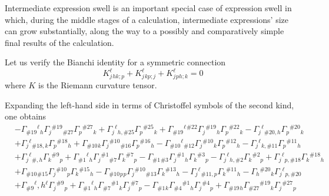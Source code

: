 Intermediate expression swell is an important special case of expression swell in which, during the middle stages of a calculation, intermediate expressions' size can grow substantially, along the way to a possibly and comparatively simple final results of the calculation.
%
\begin{example}
  Let us verify the Bianchi identity for a symmetric connection
  \begin{equation*}
    K^{\ell}_{j}{}_{hk;p} + K^{\ell}_{j}{}_{kp;j} + K^{\ell}_{j}{}_{ph;k} = 0
  \end{equation*}
  where $K$ is the Riemann curvature tensor.

  Expanding the left-hand side in terms of Christoffel symbols of the second kind, one obtains
  \begin{equation*}
    \begin{aligned}
      & -\Gamma_{\# 19}{ }^{\ell}{ }_h \Gamma_j{ }^{\# 19}{ }_{\# 27} \Gamma_p{ }^{\# 27}{ }_k+\Gamma_j{ }^{\ell}{ }_{h, \# 25} \Gamma_p{ }^{\# 25}{ }_k+\Gamma_{\# 19}{ }^{\ell}{ }^{\# 22} \Gamma_j{ }^{\# 19}{ }_h \Gamma_p{ }^{\# 22}{ }_k-\Gamma_j{ }^{\ell}{ }_{\# 20, h} \Gamma_p{ }^{\# 20}{ }_k \\
      & +\Gamma_j{ }^{\ell}{ }_{\# 18, k} \Gamma_p{ }^{\# 18}{ }_h+\Gamma_{\# 10}{ }_k \Gamma_j{ }^{\# 10}{ }_{\# 16} \Gamma_p{ }^{\# 16}{ }_h-\Gamma_{\# 10}{ }^{\ell}{ }_{\# 12} \Gamma_j{ }^{\# 10}{ }_k \Gamma_p{ }^{\# 12}{ }_h-\Gamma_j{ }^{\ell}{ }_{k, \# 11} \Gamma_p{ }^{\# 11}{ }_h \\
      & +\Gamma_j{ }^{\ell}{ }_{\#, h} \Gamma_k{ }^{\# 9}{ }_p+\Gamma_{\# 1}{ }^{\ell}{ }_h \Gamma_j{ }^{\# 1}{ }_{\# 7} \Gamma_k{ }^{\# 7}{ }_p-\Gamma_{\# 1}{ }_{\# 3} \Gamma_j{ }^{\# 1}{ }_h \Gamma_k{ }^{\# 3}{ }_p-\Gamma_j{ }^{\ell}{ }_{h, \# 2} \Gamma_k{ }^{\# 2}{ }_p+\Gamma_j{ }^{\ell}{ }_{p, \# 18} \Gamma_k{ }^{\# 18}{ }_h \\
      & +\Gamma_{\# 10}{ }_{\# 15} \Gamma_j{ }^{\# 10}{ }_p \Gamma_k{ }^{\# 15}{ }_h-\Gamma_{\# 10}{ }_p{ }_p \Gamma_j{ }^{\# 10}{ }_{\# 13} \Gamma_k{ }^{\# 13}{ }_h-\Gamma_j{ }^{\ell}{ }_{\# 11, p} \Gamma_k{ }^{\# 11}{ }_h-\Gamma_h{ }^{\# 20}{ }_k \Gamma_j{ }^{\ell}{ }_{p, \# 20} \\
      & +\Gamma_{\# 9}{ }^{\ell}, h{ }^{\ell} \Gamma_j{ }^{\# 9}{ }_p+\Gamma_{\# 1}{ }^{\ell}{ }_h \Gamma_{\# 7}{ }^{\# 1}{ }_k \Gamma_j{ }^{\# 7}{ }_p-\Gamma_{\# 1}{ }_k \Gamma_{\# 4}{ }^{\# 1}{ }_h \Gamma_j{ }^{\# 4}{ }_p+\Gamma_{\# 19}{ }_h \Gamma_{\# 27}{ }^{\# 19}{ }_k \Gamma_j{ }^{\# 27}{ }_p \\

\end{aligned}
\end{equation*}
\end{example}

